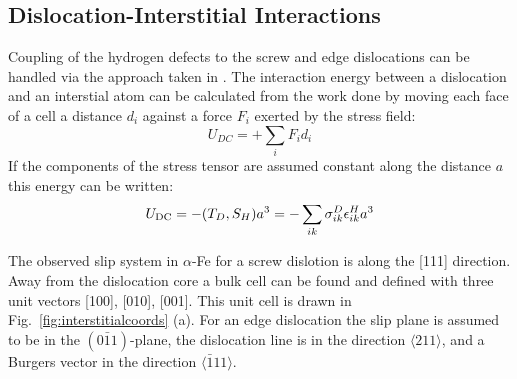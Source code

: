 \subsection{Dislocation-Interstitial Interactions}
Coupling of the hydrogen defects to the screw and edge dislocations can be
handled via the approach taken in \cite{cochardt55}.
The interaction energy between a dislocation and an interstial atom can
be calculated from the work done by moving each face of a cell a distance
$d_{i}$ against a force $F_{i}$ exerted by the stress field:
%
\begin{equation}
U_{DC} =+\sum_{i}F_{i}d_{i}
\end{equation}
%
If the components of the stress tensor are assumed constant along the distance $a$
this energy can be written:
%
\begin{equation}
U_{\rm{DC}} = -(T_{D},S_{H})a^{3}= -\sum_{ik} \sigma_{ik}^{D}\epsilon^{H}_{ik} a^{3}
\end{equation}
%

The observed slip system in $\alpha$-Fe for a screw dislotion is along the [111]
direction. Away from the dislocation core a bulk cell can be found and defined
with three unit vectors [100], [010], [001]. This unit cell is drawn in
Fig.~\ref{fig:interstitialcoords} (a). For an edge dislocation the slip plane is
assumed to be in the $(0\bar{1}1)$-plane, the dislocation line is in the direction
$\langle 211 \rangle$, and a Burgers vector in the direction $\langle \bar{1}11 \rangle$.

